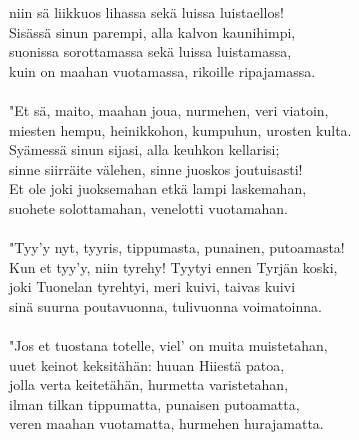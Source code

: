 niin sä liikkuos lihassa sekä luissa luistaellos!                      \\
Sisässä sinun parempi, alla kalvon kaunihimpi,                         \\
suonissa sorottamassa sekä luissa luistamassa,                         \\
kuin on maahan vuotamassa, rikoille ripajamassa.                       \\
                                                                       \\
"Et sä, maito, maahan joua, nurmehen, veri viatoin,                    \\
miesten hempu, heinikkohon, kumpuhun, urosten kulta.                   \\
Syämessä sinun sijasi, alla keuhkon kellarisi;                         \\
sinne siirräite välehen, sinne juoskos joutuisasti!                    \\
Et ole joki juoksemahan etkä lampi laskemahan,                         \\
suohete solottamahan, venelotti vuotamahan.                            \\
                                                                       \\
"Tyy'y nyt, tyyris, tippumasta, punainen, putoamasta!                  \\
Kun et tyy'y, niin tyrehy! Tyytyi ennen Tyrjän koski,                  \\
joki Tuonelan tyrehtyi, meri kuivi, taivas kuivi                       \\
sinä suurna poutavuonna, tulivuonna voimatoinna.                       \\
                                                                       \\
"Jos et tuostana totelle, viel' on muita muistetahan,                  \\
uuet keinot keksitähän: huuan Hiiestä patoa,                           \\
jolla verta keitetähän, hurmetta varistetahan,                         \\
ilman tilkan tippumatta, punaisen putoamatta,                          \\
veren maahan vuotamatta, hurmehen hurajamatta.                         \\
                                                                       \\
